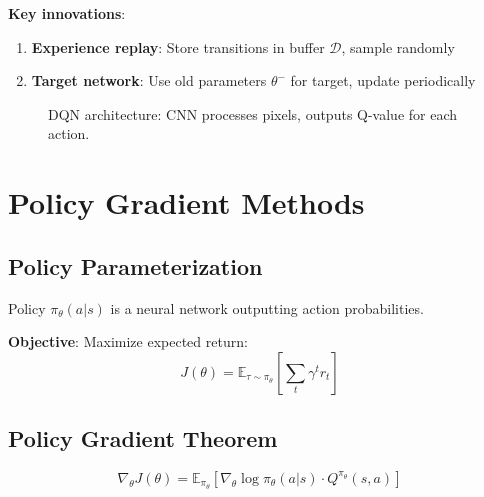 \textbf{Key innovations}:
\begin{enumerate}
    \item \textbf{Experience replay}: Store transitions in buffer $\mathcal{D}$, sample randomly
    \item \textbf{Target network}: Use old parameters $\theta^-$ for target, update periodically
\end{enumerate}

\begin{figure}[h]
\centering
{}
\caption{DQN architecture: CNN processes pixels, outputs Q-value for each action.}
\end{figure}


\section{Policy Gradient Methods}


\subsection{Policy Parameterization}

Policy $\pi_\theta(a|s)$ is a neural network outputting action probabilities.

\textbf{Objective}: Maximize expected return:
\begin{equation}
    J(\theta) = \mathbb{E}_{\tau \sim \pi_\theta} \left[ \sum_t \gamma^t r_t \right]
\end{equation}

\subsection{Policy Gradient Theorem}

\begin{equation}
    \nabla_\theta J(\theta) = \mathbb{E}_{\pi_\theta} \left[ \nabla_\theta \log \pi_\theta(a|s) \cdot Q^{\pi_\theta}(s,a) \right]
\end{equation}

